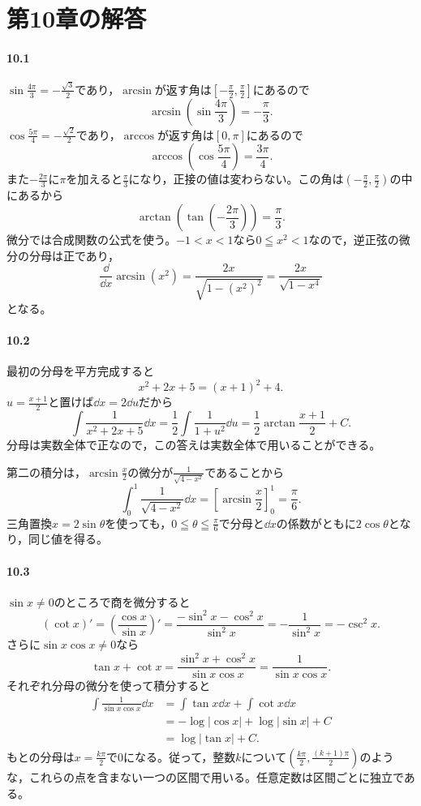 \section{第10章の解答}\label{解答:第10章}

\paragraph{10.1}
$\sin\frac{4\pi}3=-\frac{\sqrt3}2$であり，$\arcsin$が返す角は$\left[-\frac\pi2,\frac\pi2\right]$にあるので
\[
\arcsin\left(\sin\frac{4\pi}3\right)=-\frac\pi3.
\]
$\cos\frac{5\pi}4=-\frac{\sqrt2}2$であり，$\arccos$が返す角は$[0,\pi]$にあるので
\[
\arccos\left(\cos\frac{5\pi}4\right)=\frac{3\pi}4.
\]
また$-\frac{2\pi}3$に$\pi$を加えると$\frac\pi3$になり，正接の値は変わらない。この角は$\left(-\frac\pi2,\frac\pi2\right)$の中にあるから
\[
\arctan\left(\tan\left(-\frac{2\pi}3\right)\right)=\frac\pi3.
\]
微分では合成関数の公式を使う。$-1<x<1$なら$0\leqq x^2<1$なので，逆正弦の微分の分母は正であり，
\[
\frac{\dd}{\dd x}\arcsin(x^2)
=\frac{2x}{\sqrt{1-(x^2)^2}}
=\frac{2x}{\sqrt{1-x^4}}
\]
となる。

\paragraph{10.2}
最初の分母を平方完成すると
\[
x^2+2x+5=(x+1)^2+4.
\]
$u=\frac{x+1}{2}$と置けば$\dd x=2\dd u$だから
\[
\int\frac1{x^2+2x+5}\dd x
=\frac12\int\frac1{1+u^2}\dd u
=\frac12\arctan\frac{x+1}{2}+C.
\]
分母は実数全体で正なので，この答えは実数全体で用いることができる。

第二の積分は，$\arcsin\frac x2$の微分が$\frac1{\sqrt{4-x^2}}$であることから
\[
\int_0^1\frac1{\sqrt{4-x^2}}\dd x
=\left[\arcsin\frac x2\right]_0^1
=\frac\pi6.
\]
三角置換$x=2\sin\theta$を使っても，$0\leqq\theta\leqq\frac\pi6$で分母と$\dd x$の係数がともに$2\cos\theta$となり，同じ値を得る。

\paragraph{10.3}
$\sin x\ne0$のところで商を微分すると
\[
(\cot x)'
=\left(\frac{\cos x}{\sin x}\right)'
=\frac{-\sin^2x-\cos^2x}{\sin^2x}
=-\frac1{\sin^2x}=-\csc^2x.
\]
さらに$\sin x\cos x\ne0$なら
\[
\tan x+\cot x
=\frac{\sin^2x+\cos^2x}{\sin x\cos x}
=\frac1{\sin x\cos x}.
\]
それぞれ分母の微分を使って積分すると
\[
\begin{aligned}
\int\frac1{\sin x\cos x}\dd x
&=\int\tan x\dd x+\int\cot x\dd x\\
&=-\log|\cos x|+\log|\sin x|+C\\
&=\log|\tan x|+C.
\end{aligned}
\]
もとの分母は$x=\frac{k\pi}{2}$で$0$になる。従って，整数$k$について$\left(\frac{k\pi}{2},\frac{(k+1)\pi}{2}\right)$のような，これらの点を含まない一つの区間で用いる。任意定数は区間ごとに独立である。

